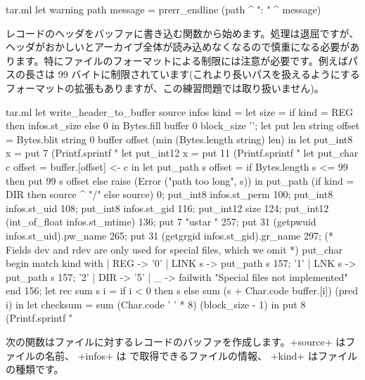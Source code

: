 \begin{answer}
\begin{listingcodefile}{tar.ml}
let warning path message =  prerr_endline (path ^ ": " ^ message)
\end{listingcodefile}
%
レコードのヘッダをバッファに書き込む関数から始めます。処理は退屈ですが、ヘッダがおかしいとアーカイブ全体が読み込めなくなるので慎重になる必要があります。特にファイルのフォーマットによる制限には注意が必要です。例えばパスの長さは 99 バイトに制限されています(これより長いパスを扱えるようにするフォーマットの拡張もありますが、この練習問題では取り扱いません)。
%
\begin{listingcodefile}{tar.ml}
let write_header_to_buffer source infos kind =
  let size = if kind = REG then infos.st_size else 0 in
  Bytes.fill buffer 0 block_size '';
  let put len string offset =
    Bytes.blit string 0 buffer offset (min (Bytes.length string) len) in
  let put_int8 x = put 7 (Printf.sprintf "%
  let put_int12 x = put 11 (Printf.sprintf "%
  let put_char c offset = buffer.[offset] <- c in
  let put_path s offset =
    if Bytes.length s <= 99 then put 99 s offset
    else raise (Error ("path too long", s)) in
  put_path (if kind = DIR then source ^ "/" else source) 0;
  put_int8 infos.st_perm 100;
  put_int8 infos.st_uid 108;
  put_int8 infos.st_gid 116;
  put_int12 size 124;
  put_int12 (int_of_float infos.st_mtime) 136;
  put 7 "ustar  " 257;
  put 31 (getpwuid infos.st_uid).pw_name 265;
  put 31 (getgrgid infos.st_gid).gr_name 297;
  (* Fields dev and rdev are only used for special files, which we omit *)
  put_char
    begin match kind with
    | REG -> '0'
    | LINK s -> put_path s 157; '1'
    | LNK s ->  put_path s 157; '2'
    | DIR -> '5'
    | _ -> failwith "Special files not implemented"
    end 156;
  let rec sum s i =
    if i < 0 then s else sum (s + Char.code buffer.[i]) (pred i) in
  let checksum = sum (Char.code ' ' * 8) (block_size - 1)  in
  put 8 (Printf.sprintf "%
\end{listingcodefile}
%
次の関数はファイルに対するレコードのバッファを作成します。\ml+source+ はファイルの名前、 \ml+infos+ は  で取得できるファイルの情報、 \ml+kind+ はファイルの種類です。

\end{answer}
